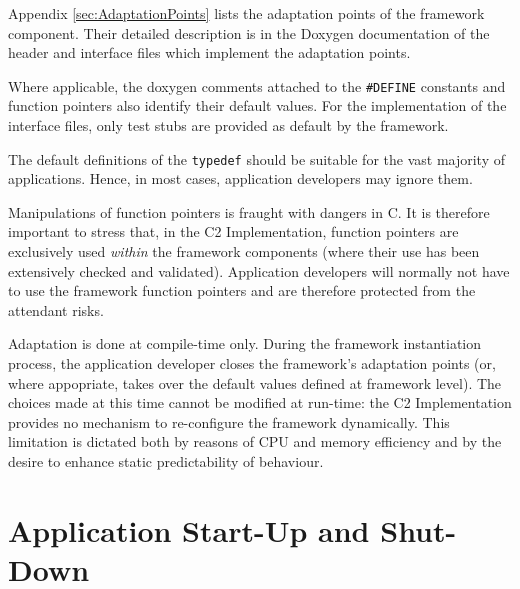 \documentclass{pnp_article}
\begin{document}

Appendix \ref{sec:AdaptationPoints} lists the adaptation points of the framework component. Their detailed description is in the Doxygen documentation of the header and interface files which implement the adaptation points. 

Where applicable, the doxygen comments attached to the \texttt{\#DEFINE} constants and function pointers also identify their default values. For the implementation of the interface files, only test stubs are provided as default by the framework.

The default definitions of the \texttt{typedef} should be suitable for the vast majority of applications. Hence, in most cases, application developers may ignore them.

Manipulations of function pointers is fraught with dangers in C. It is therefore important to stress that, in the C2 Implementation, function pointers are exclusively used \textit{within} the framework components (where their use has been extensively checked and validated). Application developers will normally not have to use the framework function pointers and are therefore protected from the attendant risks.

Adaptation is done at compile-time only. During the framework instantiation process, the application developer closes the framework's adaptation points (or, where appopriate, takes over the default values defined at framework level). The choices made at this time cannot be modified at run-time: the C2 Implementation provides no mechanism to re-configure the framework dynamically. This limitation is dictated both by reasons of CPU and memory efficiency and by the desire to enhance static predictability of behaviour.

\section{Application Start-Up and Shut-Down}\label{sec:AppStartUpAndShutdown}
\end{document}
